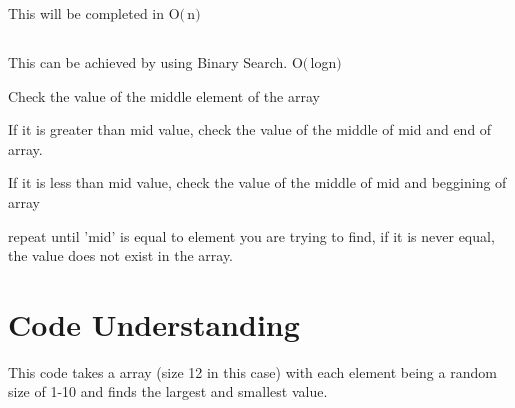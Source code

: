 \documentclass[11pt]{article} %
\begin{document}
This will be completed in O$(\,$n$)\,$
\subsection{}
This can be achieved by using Binary Search.  O$(\,$logn$)\,$

Check the value of the middle element of the array

If it is greater than mid value, check the value of the middle of mid and end of array.


If it is less than mid value, check the value of the middle of mid and beggining of array 


repeat until 'mid' is equal to element you are trying to find, if it is never equal, the value does not exist in the array.

\section{Code Understanding}
This code takes a array (size 12 in this case) with each element being a random size of 1-10 and finds the largest and smallest value.
\end{document}
